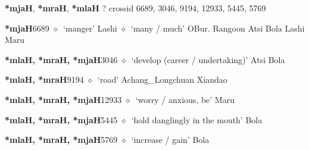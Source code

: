 \item
\textbf{*mjaH}, \textbf{*mraH}, \textbf{*mlaH}
?
  {\tiny crossid 6689, 3046, 9194, 12933, 5445, 5769}
  \begin{list}{}{\leftmargin=1.5em \itemindent=-1.5em}
  \item {\footnotesize \textbf{*mjaH}}{\tiny 6689}
         $\diamond$~`manger'
         Lashi 
\hspace{1ex}
         $\diamond$~`many / much'
         OBur. 
\hspace{1ex}
         Rangoon 
\hspace{1ex}
         Atsi 
\hspace{1ex}
         Bola 
\hspace{1ex}
         Lashi 
\hspace{1ex}
         Maru 
  \item {\footnotesize \textbf{*mlaH, *mraH, *mjaH}}{\tiny 3046}
\hspace{1ex}
         $\diamond$~`develop (career / undertaking)'
         Atsi 
\hspace{1ex}
         Bola 
  \item {\footnotesize \textbf{*mlaH, *mraH}}{\tiny 9194}
\hspace{1ex}
         $\diamond$~`road'
         Achang\_Longchuan 
\hspace{1ex}
         Xiandao 
  \item {\footnotesize \textbf{*mlaH, *mraH, *mjaH}}{\tiny 12933}
\hspace{1ex}
         $\diamond$~`worry / anxious, be'
         Maru 
  \item {\footnotesize \textbf{*mlaH, *mraH, *mjaH}}{\tiny 5445}
\hspace{1ex}
         $\diamond$~`hold danglingly in the mouth'
         Bola 
  \item {\footnotesize \textbf{*mlaH, *mraH, *mjaH}}{\tiny 5769}
\hspace{1ex}
         $\diamond$~`increase / gain'
         Bola 
  \end{list}
\item
